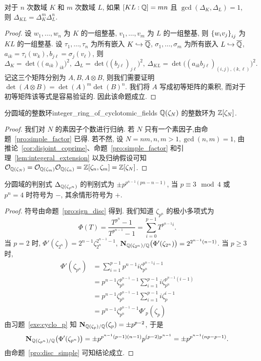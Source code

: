 \begin{corollary}{}{}
对于 $n$ 次数域 $K$ 和 $m$ 次数域 $L$, 如果 $[KL:{\mathbb{Q}}]=mn$ 且 $\gcd(\Delta_K,\Delta_L)=1$, 则 $\Delta_{KL}=\Delta_K^m\Delta_L^n$.
\end{corollary}
\begin{proof}
设 $w_1,\dots,w_n$ 为 $K$ 的一组整基, $v_1,\dots,v_m$ 为 $L$ 的一组整基, 则 $\left\{w_iv_j\right\}_{ij}$ 为 $KL$ 的一组整基. 设 $\tau_1,\dots,\tau_n$ 为所有嵌入 $K\hookrightarrow\overline{{\mathbb{Q}}}$, $\sigma_1,\dots,\sigma_m$ 为所有嵌入 $L\hookrightarrow\overline{{\mathbb{Q}}}$, $a_{ik}=\tau_i(w_k),b_{j\ell}=\sigma_j(v_\ell)$, 则
	\[\Delta_K=\det\bigl((a_{ik})_{ik}\bigr)^2,\ 
		\Delta_L=\det\bigl((b_{j\ell})_{j\ell}\bigr)^2,\ 
		\Delta_{KL}=\det\bigl((a_{ik}b_{j\ell})_{(i,j),(k,\ell)}\bigr)^2.\]
记这三个矩阵分别为 $A,B,A\otimes B$, 则我们需要证明 $\det(A\otimes B)=\det(A)^m\det(B)^n$. 我们将 $A$ 写成初等矩阵的乘积, 而对于初等矩阵该等式是容易验证的. 因此该命题成立.
\end{proof}



\begin{theorem}{分圆域的整数环}{integer_ring_of_cyclotomic_fields}
${\mathbb{Q}}(\zeta_N)$ 的整数环为 ${\mathbb{Z}}[\zeta_N]$.
\end{theorem}
\begin{proof}
我们对 $N$ 的素因子个数进行归纳. 若 $N$ 只有一个素因子,由命题~\ref{pro:simple_factor} 已得. 若不然, 设 $N=nm,n,m>1,\gcd(n,m)=1$, 由推论~\ref{cor:disjoint_coprime}、命题~\ref{pro:simple_factor} 和引理~\ref{lem:integeral_extension} 以及归纳假设可知 ${\mathcal{O}}_{{\mathbb{Q}}(\zeta_N)}={\mathcal{O}}_{{\mathbb{Q}}(\zeta_m)}{\mathcal{O}}_{{\mathbb{Q}}(\zeta_n)}={\mathbb{Z}}[\zeta_n,\zeta_m]={\mathbb{Z}}[\zeta_N]$.
\end{proof}

\begin{proposition}{分圆域的判别式}{}
$\Delta_{{\mathbb{Q}}(\zeta_{p^n})}$ 的判别式为 $\pm p^{p^{n-1}(pn-n-1)}$, 当 $p\equiv 3\mod 4$ 或 $p^n=4$ 时符号为 $-$, 其余情形符号为 $+$.
\end{proposition}
\begin{proof}
符号由命题~\ref{pro:sign_disc} 得到. 我们知道 $\zeta_{p^n}$ 的极小多项式为
  \[\Phi(T)=\frac{T^{p^n}-1}{T^{p^{n-1}}-1}=\sum_{i=0}^{p-1} T^{p^{n-1}i}.\]
当 $p=2$ 时, $\Phi'(\zeta_{2^n})=2^{n-1}\zeta_{2^n}^{2^{n-1}-1}$, ${\mathbf{N}}_{{\mathbb{Q}}(\zeta_{2^n})/{\mathbb{Q}}}\bigl(\Phi'(\zeta_{2^n})\bigr)=2^{2^{n-1}(n-1)}$. 当 $p\ge 3$ 时, 
  \[\begin{split}
    \Phi'(\zeta_{p^n})&=\sum_{i=1}^{p-1}p^{n-1}i\zeta_{p^n}^{p^{n-1}i-1}\\
     &=p^{n-1}\zeta_{p^n}^{p^{n-1}-1}\sum_{i=1}^{p-1}i\zeta_{p^n}^{p^{n-1}(i-1)}\\
     &=p^{n-1}\zeta_{p^n}^{p^{n-1}-1}\sum_{i=1}^{p-1}i\zeta_{p}^{i-1}\\
     &=p^{n-1}\zeta_{p^n}^{p^{n-1}-1}\Phi'_p(\zeta_p)
  \end{split}\]
由习题~\ref{exe:cyclo_p} 知 ${\mathbf{N}}_{{\mathbb{Q}}(\zeta_p)/{\mathbb{Q}}}(\zeta_p)=\pm p^{p-2}$, 于是
  \[{\mathbf{N}}_{{\mathbb{Q}}(\zeta_{p^n})/{\mathbb{Q}}}\bigl(\Phi'(\zeta_{p^n})\bigr)=\pm p^{p^{n-1}(p-1)(n-1)} p^{(p-2)p^{n-1}}=\pm p^{p^{n-1}(np-p-1)}.\]
由命题~\ref{pro:disc_simple} 可知结论成立.
\end{proof}

